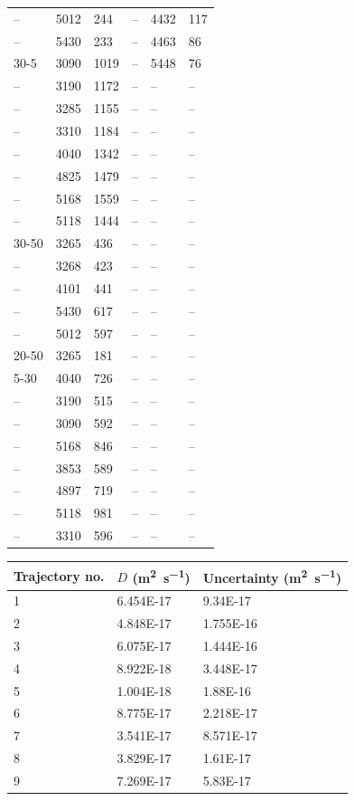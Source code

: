 \begin{xltabular}{\linewidth}{|Y|Y|Y|Y|Y|Y|}
-- & 5012 & 244 & -- & 4432 & 117 \\
-- & 5430 & 233 & -- & 4463 & 86 \\
30-5 & 3090 & 1019 & -- & 5448 & 76 \\
-- & 3190 & 1172 & -- & -- & -- \\
-- & 3285 & 1155 & -- & -- & -- \\
-- & 3310 & 1184 & -- & -- & -- \\
-- & 4040 & 1342 & -- & -- & -- \\
-- & 4825 & 1479 & -- & -- & -- \\
-- & 5168 & 1559 & -- & -- & -- \\
-- & 5118 & 1444 & -- & -- & -- \\
30-50 & 3265 & 436 & -- & -- & -- \\
-- & 3268 & 423 & -- & -- & -- \\
-- & 4101 & 441 & -- & -- & -- \\
-- & 5430 & 617 & -- & -- & -- \\
-- & 5012 & 597 & -- & -- & -- \\
20-50 & 3265 & 181 & -- & -- & -- \\
5-30 & 4040 & 726 & -- & -- & -- \\
-- & 3190 & 515 & -- & -- & -- \\
-- & 3090 & 592 & -- & -- & -- \\
-- & 5168 & 846 & -- & -- & -- \\
-- & 3853 & 589 & -- & -- & -- \\
-- & 4897 & 719 & -- & -- & -- \\
-- & 5118 & 981 & -- & -- & -- \\
-- & 3310 & 596 & -- & -- & -- \\
\hline
\end{xltabular}

\begin{table}
    \centering
    \begin{tabular}{|l|l|l|}
    \hline
    Trajectory no. & $D$ (\si{\meter\squared\per\second}) & Uncertainty  (\si{\meter\squared\per\second})  \\
    \hline
    1 &	6.454E-17	& 9.34E-17 \\
    2 &	4.848E-17	& 1.755E-16 \\
    3 &	6.075E-17	& 1.444E-16 \\
    4 &	8.922E-18	& 3.448E-17 \\
    5 &	1.004E-18	& 1.88E-16 \\
    6 &	8.775E-17	& 2.218E-17 \\
    7 &	3.541E-17	& 8.571E-17 \\
    8 &	3.829E-17	& 1.61E-17 \\
    9 &	7.269E-17	& 5.83E-17 \\
    \hline
    \end{tabular}
    \label{tab:wat_s2}
\end{table}

